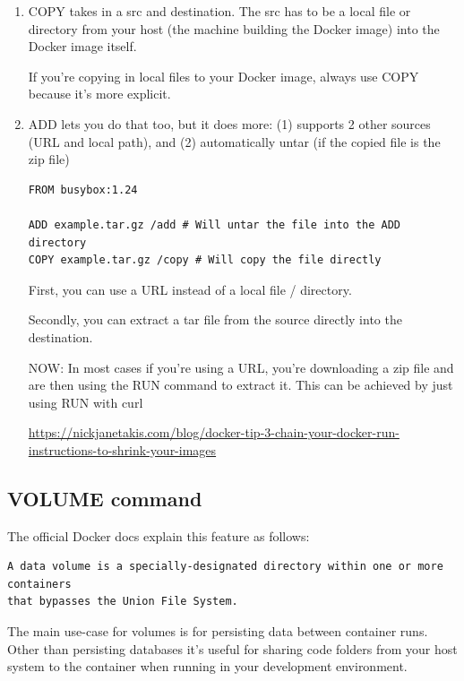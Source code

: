 \begin{enumerate}
  
  \item  COPY takes in a src and destination. The src has to be a local file or
  directory from your host (the machine building the Docker image) into the
  Docker image itself.
  
  If you’re copying in local files to your Docker image, always use COPY because it’s more explicit.
  
  \item ADD lets you do that too, but it does more: (1) supports 2 other
  sources (URL and local path), and (2) automatically untar (if the copied file is the zip file)

\begin{verbatim}
FROM busybox:1.24

ADD example.tar.gz /add # Will untar the file into the ADD directory
COPY example.tar.gz /copy # Will copy the file directly

\end{verbatim}
  
  First, you can use a URL instead of a local file / directory. 
  
  Secondly, you can extract a tar file from the source directly into the destination.
  
  NOW: In most cases if you’re using a URL, you’re downloading a zip file and
  are then using the RUN command to extract it. 
  This can be achieved by just using RUN with curl
  
  \url{https://nickjanetakis.com/blog/docker-tip-3-chain-your-docker-run-instructions-to-shrink-your-images}
\end{enumerate}

\subsection{VOLUME command}
\label{sec:docker-volume}

The official Docker docs explain this feature as follows:
\begin{verbatim}
A data volume is a specially-designated directory within one or more containers
that bypasses the Union File System.
\end{verbatim}

The main use-case for volumes is for persisting data between container runs.
Other than persisting databases it's useful for sharing code folders from your
host system to the container when running in your development environment.

